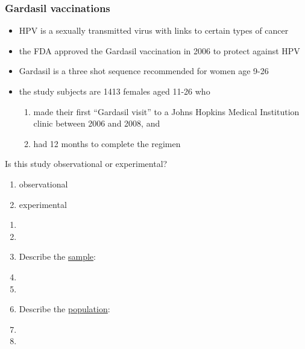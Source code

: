 \begin{frame}
\frametitle{Gardasil vaccinations}
\begin{itemize}
    \item
    HPV is a sexually transmitted virus with links to certain types of cancer
    \item
    the FDA approved the Gardasil vaccination in 2006 to protect against HPV
    \item
    Gardasil is a three shot sequence recommended for women age 9-26
    \item
     the study subjects are 1413 females aged 11-26 who
     \begin{enumerate}
     \item
     made their first ``Gardasil visit'' to a Johns Hopkins Medical Institution clinic between 2006 and 2008, and
     \item
      had 12 months to complete the regimen
\end{enumerate}
\end{itemize}
\end{frame}

\begin{frame}
\begin{clicker}{Is this study observational or experimental?}
\begin{enumerate}
    \item
    observational
    \item
    experimental
\end{enumerate}
\end{clicker}
\begin{enumerate}
    \item[]
    \item[]
    \item
    Describe the \underline{sample}:
    \item[]
    \item[]
    \item
    Describe the \underline{population}:
    \item[]
    \item[]
\end{enumerate}
\end{frame}

